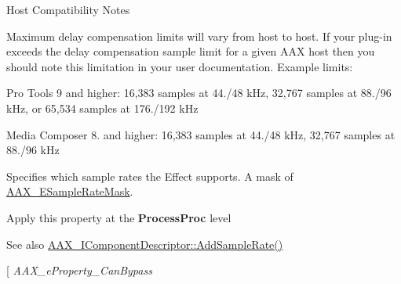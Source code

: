 \begin{Desc}
\begin{description}
\begin{DoxyRefDesc}{Host Compatibility Notes}
\item[\hyperlink{a00380__compatibility_notes000062}{Host Compatibility Notes}]Maximum delay compensation limits will vary from host to host. If your plug-\/in exceeds the delay compensation sample limit for a given A\+A\+X host then you should note this limitation in your user documentation. Example limits\+:
\begin{DoxyItemize}
\item Pro Tools 9 and higher\+: 16,383 samples at 44./48 k\+Hz, 32,767 samples at 88./96 k\+Hz, or 65,534 samples at 176./192 k\+Hz
\item Media Composer 8. and higher\+: 16,383 samples at 44./48 k\+Hz, 32,767 samples at 88./96 k\+Hz 
\end{DoxyItemize}\end{DoxyRefDesc}
\item[{\em 
\hypertarget{a00283_a6571f4e41a5dd06e4067249228e2249eac5294e2feb18587d57b6ca0216a6bb1e}{}A\+A\+X\+\_\+e\+Property\+\_\+\+Sample\+Rate\label{a00283_a6571f4e41a5dd06e4067249228e2249eac5294e2feb18587d57b6ca0216a6bb1e}
}]Specifies which sample rates the Effect supports. A mask of \hyperlink{a00206_a5bb98259de21d2c4d04a2d6010d757c7}{A\+A\+X\+\_\+\+E\+Sample\+Rate\+Mask}. \begin{DoxyItemize}
\item Apply this property at the {\bfseries Process\+Proc} level\end{DoxyItemize}
\begin{DoxySeeAlso}{See also}
\hyperlink{a00088_adbd57beaa0a3143d3cf44b93ecdb59ec}{A\+A\+X\+\_\+\+I\+Component\+Descriptor\+::\+Add\+Sample\+Rate()} 
\end{DoxySeeAlso}
\item[{\em 
\hypertarget{a00283_a6571f4e41a5dd06e4067249228e2249ea6819867a9e86913e59decf318416d755}{}A\+A\+X\+\_\+e\+Property\+\_\+\+Can\+Bypass\label{a00283_a6571f4e41a5dd06e4067249228e2249ea6819867a9e86913e59decf318416d755}
}
\end{description}
\end{Desc}
